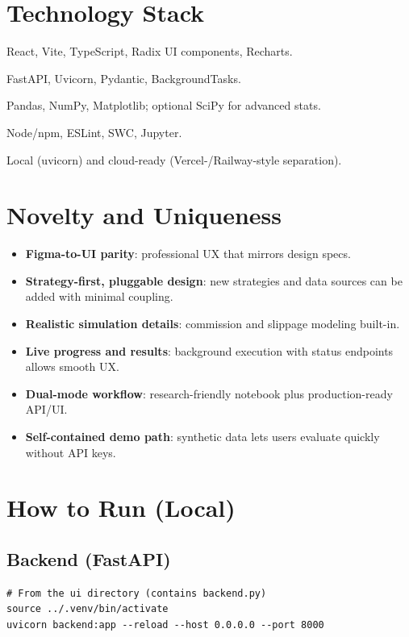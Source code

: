 \documentclass[11pt,a4paper]{article}
\begin{document}
\section{Technology Stack}
\begin{description}[leftmargin=*,style=nextline]
  \item[Frontend] React, Vite, TypeScript, Radix UI components, Recharts.
  \item[Backend] FastAPI, Uvicorn, Pydantic, BackgroundTasks.
  \item[Analytics] Pandas, NumPy, Matplotlib; optional SciPy for advanced stats.
  \item[Dev/Tooling] Node/npm, ESLint, SWC, Jupyter.
  \item[Deployment] Local (uvicorn) and cloud-ready (Vercel-/Railway-style separation).
\end{description}

\section{Novelty and Uniqueness}
\begin{itemize}[leftmargin=*]
  \item \textbf{Figma-to-UI parity}: professional UX that mirrors design specs.
  \item \textbf{Strategy-first, pluggable design}: new strategies and data sources can be added with minimal coupling.
  \item \textbf{Realistic simulation details}: commission and slippage modeling built-in.
  \item \textbf{Live progress and results}: background execution with status endpoints allows smooth UX.
  \item \textbf{Dual-mode workflow}: research-friendly notebook plus production-ready API/UI.
  \item \textbf{Self-contained demo path}: synthetic data lets users evaluate quickly without API keys.
\end{itemize}

\section{How to Run (Local)}
\subsection*{Backend (FastAPI)}
\begin{lstlisting}[style=code]
# From the ui directory (contains backend.py)
source ../.venv/bin/activate
uvicorn backend:app --reload --host 0.0.0.0 --port 8000
\end{lstlisting}
\end{document}
